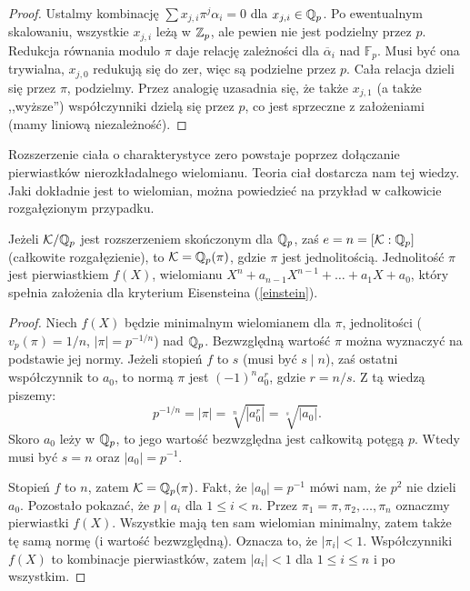 \begin{proof}
	Ustalmy kombinację $\sum x_{j,i} \pi^j \alpha_i = 0$ dla $x_{j,i} \in \mathbb Q_p$.
	Po ewentualnym skalowaniu, wszystkie $x_{j,i}$ leżą w $\mathbb Z_p$, ale pewien nie jest podzielny przez $p$.
	Redukcja równania modulo $\pi$ daje relację zależności dla $\overline \alpha_i$ nad $\mathbb F_p$.
	Musi być ona trywialna, $x_{j,0}$ redukują się do zer, więc są podzielne przez $p$.
	Cała relacja dzieli się przez $\pi$, podzielmy.
	Przez analogię uzasadnia się, że także $x_{j,1}$ (a także ,,wyższe'') współczynniki dzielą się przez $p$, co jest sprzeczne z założeniami (mamy liniową niezależność).
\end{proof}

Rozszerzenie ciała o charakterystyce zero powstaje poprzez dołączanie pierwiastków nierozkładalnego wielomianu.
Teoria ciał dostarcza nam tej wiedzy.
Jaki dokładnie jest to wielomian, można powiedzieć na przykład w całkowicie rozgałęzionym przypadku.

\begin{fakt}
	Jeżeli $\mathcal K / \mathbb Q_p$ jest rozszerzeniem skończonym dla $\mathbb Q_p$, zaś $e = n = [\mathcal K : \mathbb Q_p]$ (całkowite rozgałęzienie), to $\mathcal K = \mathbb Q_p(\pi)$, gdzie $\pi$ jest jednolitością.
	Jednolitość $\pi$ jest pierwiastkiem $f(X)$, wielomianu $X^n + a_{n-1} X^{n-1} + \ldots + a_1 X + a_0$, który spełnia założenia dla kryterium Eisensteina (\ref{einstein}).
\end{fakt}

\begin{proof}
	Niech $f(X)$ będzie minimalnym wielomianem dla $\pi$, jednolitości ($v_p(\pi) = 1/n$, $|\pi| = p^{-1/n}$) nad $\mathbb Q_p$.
	Bezwzględną wartość $\pi$ można wyznaczyć na podstawie jej normy.
	Jeżeli stopień $f$ to $s$ (musi być $s \mid n$), zaś ostatni współczynnik to $a_0$, to normą $\pi$ jest $(-1)^n a_0^r$, gdzie $r = n/s$.
	Z tą wiedzą piszemy:
	\[
		p^{-1/n} = |\pi| = \sqrt[n]{|a_0^r|} = \sqrt[s]{|a_0|}.
	\]
	Skoro $a_0$ leży w $\mathbb Q_p$, to jego wartość bezwzględna jest całkowitą potęgą $p$.
	Wtedy musi być $s = n$ oraz $|a_0| = p^{-1}$.

	Stopień $f$ to $n$, zatem $\mathcal K = \mathbb Q_p(\pi)$.
	Fakt, że $|a_0| = p^{-1}$ mówi nam, że $p^2$ nie dzieli $a_0$.
	Pozostało pokazać, że $p \mid a_i$ dla $1 \le i < n$.
	Przez $\pi_1 = \pi, \pi_2, \dots, \pi_n$ oznaczmy pierwiastki $f(X)$.
	Wszystkie mają ten sam wielomian minimalny, zatem także tę samą normę (i wartość bezwzględną).
	Oznacza to, że $|\pi_i| < 1$.
	Współczynniki $f(X)$ to kombinacje pierwiastków, zatem $|a_i| < 1$ dla $1 \le i \le n$ i po wszystkim.
\end{proof}

